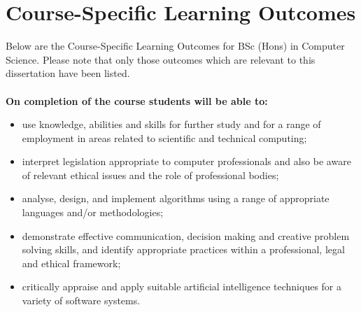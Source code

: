 %
%

\section*{Course-Specific Learning Outcomes}
{\tiny }Below are the Course-Specific Learning Outcomes for BSc (Hons) in Computer Science. Please note that only those outcomes which are relevant to this dissertation have been listed. \\\\
\textbf{On completion of the course students will be able to:}
\begin{itemize}
	\item  use knowledge, abilities and skills for further study and for a range of employment in areas related to scientific
	and technical computing;
	\item interpret legislation appropriate to computer professionals and also be aware of relevant ethical issues and the role of professional bodies;
	\item analyse, design, and implement algorithms using a range of appropriate languages and/or methodologies;
	\item demonstrate effective communication, decision making and creative problem solving skills, and identify appropriate practices within a professional, legal and ethical framework;
	\item critically appraise and apply suitable artificial intelligence techniques for a variety of software systems.\\
\end{itemize}